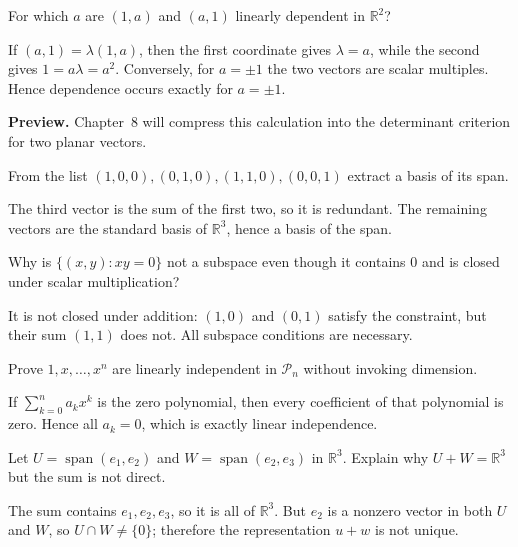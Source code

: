 \begin{problem}\label{prob:i02-problem-06}
For which $a$ are $(1,a)$ and $(a,1)$ linearly dependent in $\mathbb R^2$?
\end{problem}
\begin{solution}
If $(a,1)=\lambda(1,a)$, then the first coordinate gives $\lambda=a$, while the second gives $1=a\lambda=a^2$. Conversely, for $a=\pm1$ the two vectors are scalar multiples. Hence dependence occurs exactly for $a=\pm1$.

\textbf{Preview.} Chapter~8 will compress this calculation into the determinant criterion for two planar vectors.
\end{solution}

\begin{problem}\label{prob:i02-problem-07}
From the list $(1,0,0),(0,1,0),(1,1,0),(0,0,1)$ extract a basis of its span.
\end{problem}
\begin{solution}
The third vector is the sum of the first two, so it is redundant. The remaining vectors are the standard basis of $\mathbb R^3$, hence a basis of the span.
\end{solution}

\begin{problem}\label{prob:i02-problem-08}
Why is $\{(x,y):xy=0\}$ not a subspace even though it contains $0$ and is closed under scalar multiplication?
\end{problem}
\begin{solution}
It is not closed under addition: $(1,0)$ and $(0,1)$ satisfy the constraint, but their sum $(1,1)$ does not. All subspace conditions are necessary.
\end{solution}

\begin{problem}\label{prob:i02-problem-09}
Prove $1,x,\dots,x^n$ are linearly independent in $\mathcal P_n$ without invoking dimension.
\end{problem}
\begin{solution}
If $\sum_{k=0}^n a_kx^k$ is the zero polynomial, then every coefficient of that polynomial is zero. Hence all $a_k=0$, which is exactly linear independence.
\end{solution}

\begin{problem}\label{prob:i02-problem-10}
Let $U=\operatorname{span}(e_1,e_2)$ and $W=\operatorname{span}(e_2,e_3)$ in $\mathbb R^3$. Explain why $U+W=\mathbb R^3$ but the sum is not direct.
\end{problem}
\begin{solution}
The sum contains $e_1,e_2,e_3$, so it is all of $\mathbb R^3$. But $e_2$ is a nonzero vector in both $U$ and $W$, so $U\cap W\ne\{0\}$; therefore the representation $u+w$ is not unique.
\end{solution}


